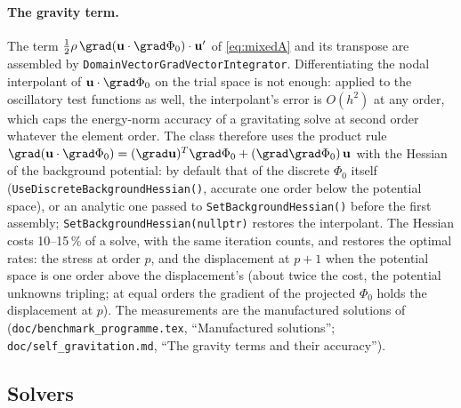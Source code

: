 \documentclass[11pt]{article}
\numberwithin{equation}{section}
\theoremstyle{remark}
\newcommand{\vu}{\mathbf{u}}
\newcommand{\code}[1]{\texttt{#1}}
\begin{document}
\paragraph{The gravity term.} The term
$\tfrac12\rho\,\grad(\vu\cdot\grad\Phi_0)\cdot\vu'$ of \eqref{eq:mixedA}
and its transpose are assembled by \code{DomainVectorGradVectorIntegrator}.
Differentiating the nodal interpolant of $\vu\cdot\grad\Phi_0$ on the trial
space is not enough: applied to the oscillatory test functions as well, the
interpolant's error is $O(h^2)$ at any order, which caps the energy-norm
accuracy of a gravitating solve at second order whatever the element
order. The class therefore uses the product rule
$\grad(\vu\cdot\grad\Phi_0) = (\grad\vu)^T\grad\Phi_0 +
(\grad\grad\Phi_0)\,\vu$ with the Hessian of the background potential: by
default that of the discrete $\Phi_0$ itself
(\code{UseDiscreteBackgroundHessian()}, accurate one order below the
potential space), or an analytic one passed to
\code{SetBackgroundHessian()} before the first assembly;
\code{SetBackgroundHessian(nullptr)} restores the interpolant. The Hessian
costs 10--15\,\% of a solve, with the same iteration counts, and restores
the optimal rates: the stress at order $p$, and the displacement at $p+1$
when the potential space is one order above the displacement's (about twice
the cost, the potential unknowns tripling; at equal orders the gradient of
the projected $\Phi_0$ holds the displacement at $p$). The measurements are
the manufactured solutions of 
(\code{doc/benchmark\_programme.tex}, ``Manufactured solutions'';
\code{doc/self\_gravitation.md}, ``The gravity terms and their accuracy'').

\subsection{Solvers}
\label{sec:mixed-solvers}
\end{document}

